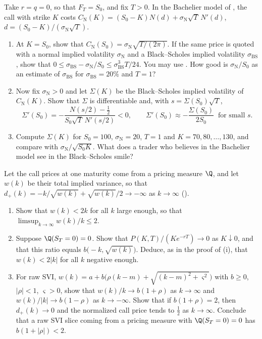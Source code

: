 \begin{exercise}\label{ex:iv-bachelier}
\medium Take $r=q=0$, so that $F_T=S_0$, and fix $T>0$. In the Bachelier model of
, the call with strike $K$ costs
$C_{\mathrm N}(K)=(S_0-K)N(d)+\sigma_{\mathrm N}\sqrt T\,N'(d)$, $d=(S_0-K)/(\sigma_{\mathrm N}\sqrt T)$.
\begin{enumerate}[label=(\alph*)]
  \item At $K=S_0$, show that $C_{\mathrm N}(S_0)=\sigma_{\mathrm N}\sqrt{T/(2\pi)}$. If the same price is quoted with
    a normal implied volatility $\sigma_{\mathrm N}$ and a Black--Scholes implied volatility
    $\sigma_{\mathrm{BS}}$, show that $0\le\sigma_{\mathrm{BS}}-\sigma_{\mathrm N}/S_0\le\sigma_{\mathrm{BS}}^3T/24$. You
    may use . How good is $\sigma_{\mathrm N}/S_0$ as an estimate of $\sigma_{\mathrm{BS}}$
    for $\sigma_{\mathrm{BS}}=20\%$ and $T=1$?
  \item Now fix $\sigma_{\mathrm N}>0$ and let $\Sigma(K)$ be the Black--Scholes implied volatility of
    $C_{\mathrm N}(K)$. Show that $\Sigma$ is differentiable and, with $s=\Sigma(S_0)\sqrt T$,
    \[
      \Sigma'(S_0)=-\frac{N(s/2)-\frac12}{S_0\sqrt T\,N'(s/2)}<0,\qquad
      \Sigma'(S_0)\approx-\frac{\Sigma(S_0)}{2S_0}\ \text{ for small }s .
    \]
  \item Compute $\Sigma(K)$ for $S_0=100$, $\sigma_{\mathrm N}=20$, $T=1$ and $K=70,80,\dots,130$, and compare
    with $\sigma_{\mathrm N}/\sqrt{S_0K}$. What does a trader who believes in the Bachelier model see in the
    Black--Scholes smile?
\end{enumerate}
\end{exercise}

\begin{exercise}\label{ex:iv-wings}
\medium Let the call prices at one maturity come from a pricing measure $\Q$, and let $w(k)$ be their
total implied variance, so that $d_+(k)=-k/\sqrt{w(k)}+\sqrt{w(k)}/2\to-\infty$ as $k\to\infty$
().
\begin{enumerate}[label=(\alph*)]
  \item Show that $w(k)<2k$ for all $k$ large enough, so that $\limsup_{k\to\infty}w(k)/k\le2$.
  \item Suppose $\Q(S_T=0)=0$. Show that $P(K,T)/(Ke^{-rT})\to0$ as $K\downarrow0$, and that this ratio
    equals $b\big(-k,\sqrt{w(k)}\big)$. Deduce, as in the proof of (i), that
    $w(k)<2|k|$ for all $k$ negative enough.
  \item For raw SVI, $w(k)=a+b\big(\rho(k-m)+\sqrt{(k-m)^2+\varsigma^2}\big)$ with $b\ge0$, $|\rho|<1$,
    $\varsigma>0$, show that $w(k)/k\to b(1+\rho)$ as $k\to\infty$ and $w(k)/|k|\to b(1-\rho)$ as
    $k\to-\infty$. Show that if $b(1+\rho)=2$, then $d_+(k)\to0$ and the normalized call price tends to
    $\frac12$ as $k\to\infty$. Conclude that a raw SVI slice coming from a pricing measure with
    $\Q(S_T=0)=0$ has $b(1+|\rho|)<2$.
\end{enumerate}
\end{exercise}

